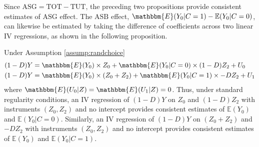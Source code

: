 Since $\text{ASG} = \text{TOT} - \text{TUT}$, the preceding two propositions provide consistent estimates of $\text{ASG}$ effect.
The $\text{ASB}$ effect, $\mathbbm{E}(Y_0|C=1) - \mathbb{E}(Y_0|C=0)$, can likewise be estimated by taking the difference of coefficients across two linear IV regressions, as shown in the following proposition.

\begin{prop}
\label{prop:ASBreg}
Under Assumption \ref{assump:randchoice}
\begin{align}
\label{eq:ASB0}
    (1 - D) Y &= \mathbbm{E}(Y_{0}) \times Z_0 + \mathbbm{E}(Y_{0}|C=0) \times (1 - D)Z_2 + U_{0}\\
\label{eq:ASB1}
    (1 - D) Y &= \mathbbm{E}(Y_{0}) \times(Z_0 + Z_2) + \mathbbm{E}(Y_{0}|C=1)\times -DZ_2 + U_{1}
\end{align}
where $\mathbbm{E}(U_0|Z) = \mathbbm{E}(U_1|Z) = 0$.
Thus, under standard regularity conditions, an IV regression of $(1 - D)Y$ on $Z_0$ and $(1 - D)Z_2$ with instruments $(Z_0, Z_2)$ and no intercept provides consistent estimates of $\mathbb{E}(Y_0)$ and $\mathbb{E}(Y_0|C=0)$. 
Similarly, an IV regression of $(1 - D)Y$ on $(Z_0 + Z_2)$ and $-DZ_2$ with instruments $(Z_0, Z_2)$ and no intercept provides consistent estimates of $\mathbb{E}(Y_0)$ and $\mathbb{E}(Y_0|C=1)$.
\end{prop}

